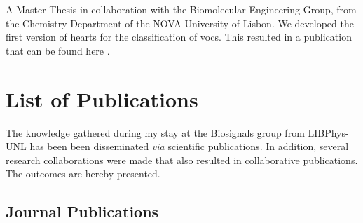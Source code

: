 A Master Thesis in collaboration with the Biomolecular Engineering Group, from the Chemistry Department of the NOVA University of Lisbon. We developed the first version of \gls{hearts} for the classification of \gls{voc}s. This resulted in a publication that can be found here \cite{class_voc}.

\section{List of Publications}

The knowledge gathered during my stay at the Biosignals group from LIBPhys-UNL has been been disseminated \textit{via} scientific publications. In addition, several research collaborations were made that also resulted in collaborative publications. The outcomes are hereby presented.

\subsection{Journal Publications}

